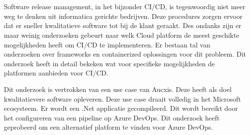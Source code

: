 
%
%

%


\chapter*{}
Software release management, in het bijzonder CI/CD, is tegenwoordig niet meer weg te denken uit informatica gerichte bedrijven. Deze procedures zorgen ervoor dat er sneller kwalitatieve software tot bij de klant geraakt. Des ondanks zijn er maar weinig onderzoeken gebeurt naar welk Cloud platform de meest geschikte mogelijkheden heeft om CI/CD te implementeren. Er bestaan tal van onderzoeken over frameworks en containerized oplossingen voor dit probleem. Dit onderzoek heeft in detail bekeken wat voor specifieke mogelijkheden de platformen aanbieden voor CI/CD. 

Dit onderzoek is vertrokken van een use case van Aucxis. Deze heeft als doel kwalitatievere software opleveren. Deze use case draait volledig in het Microsoft ecosysteem. Er wordt een .Net applicatie gecompileerd. Dit wordt bereikt door het configureren van een pipeline op Azure DevOps. Dit onderzoek heeft geprobeerd om een alternatief platform te vinden voor Azure DevOps. 

